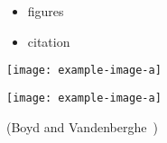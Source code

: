 \documentclass[landscape]{foils}
\begin{document}
\vf
\begin{itemize}\itemsep=20pt
    \item figures
    \item citation
\end{itemize}
\vf

\vf
\begin{minipage}{0.5\textwidth}
    \centering
    \texttt{[image: example-image-a]}
\end{minipage}%
\begin{minipage}{0.5\textwidth}
    \centering
    \texttt{[image: example-image-a]}
\end{minipage}
\vf

(Boyd and Vandenberghe~\cite{boyd2004convex})

\end{document}
